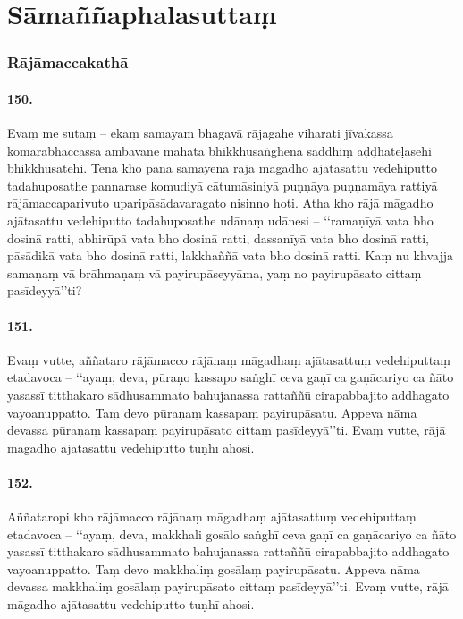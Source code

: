 \section{Sāmaññaphalasuttaṃ}

\subsubsection{Rājāmaccakathā}

\paragraph{150.}
Evaṃ me sutaṃ – ekaṃ samayaṃ bhagavā rājagahe viharati jīvakassa komārabhaccassa ambavane mahatā bhikkhusaṅghena saddhiṃ aḍḍhateḷasehi bhikkhusatehi. Tena kho pana samayena rājā māgadho ajātasattu vedehiputto tadahuposathe pannarase komudiyā cātumāsiniyā puṇṇāya puṇṇamāya rattiyā rājāmaccaparivuto uparipāsādavaragato nisinno hoti. Atha kho rājā māgadho ajātasattu vedehiputto tadahuposathe udānaṃ udānesi – ‘‘ramaṇīyā vata bho dosinā ratti, abhirūpā vata bho dosinā ratti, dassanīyā vata bho dosinā ratti, pāsādikā vata bho dosinā ratti, lakkhaññā vata bho dosinā ratti. Kaṃ nu khvajja samaṇaṃ vā brāhmaṇaṃ vā payirupāseyyāma, yaṃ no payirupāsato cittaṃ pasīdeyyā’’ti?

\paragraph{151.}
Evaṃ vutte, aññataro rājāmacco rājānaṃ māgadhaṃ ajātasattuṃ vedehiputtaṃ etadavoca – ‘‘ayaṃ, deva, pūraṇo kassapo saṅghī ceva gaṇī ca gaṇācariyo ca ñāto yasassī titthakaro sādhusammato bahujanassa rattaññū cirapabbajito addhagato vayoanuppatto. Taṃ devo pūraṇaṃ kassapaṃ payirupāsatu. Appeva nāma devassa pūraṇaṃ kassapaṃ payirupāsato cittaṃ pasīdeyyā’’ti. Evaṃ vutte, rājā māgadho ajātasattu vedehiputto tuṇhī ahosi.

\paragraph{152.}
Aññataropi kho rājāmacco rājānaṃ māgadhaṃ ajātasattuṃ vedehiputtaṃ etadavoca – ‘‘ayaṃ, deva, makkhali gosālo saṅghī ceva gaṇī ca gaṇācariyo ca ñāto yasassī titthakaro sādhusammato bahujanassa rattaññū cirapabbajito addhagato vayoanuppatto. Taṃ devo makkhaliṃ gosālaṃ payirupāsatu. Appeva nāma devassa makkhaliṃ gosālaṃ payirupāsato cittaṃ pasīdeyyā’’ti. Evaṃ vutte, rājā māgadho ajātasattu vedehiputto tuṇhī ahosi.

